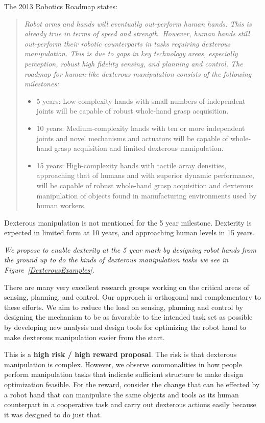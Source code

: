 The 2013 Robotics Roadmap \cite{christensen2009roadmap} states:
\begin{quotation}
{\small \it
Robot arms and hands will eventually out-perform human hands. This is already true in terms of speed and strength. However, human hands still out-perform their robotic counterparts in tasks requiring dexterous manipulation. This is due to gaps in key technology areas, especially perception, robust high fidelity sensing, and planning and control. The roadmap for human-like dexterous manipulation consists of the following milestones:
\begin{itemize}
	\item 5 years: Low-complexity hands with small numbers of independent joints will be capable of robust whole-hand grasp acquisition.
	\item 10 years: Medium-complexity hands with ten or more independent joints and novel mechanisms and actuators will be capable of whole-hand grasp acquisition and limited dexterous manipulation.
	\item 15 years: High-complexity hands with tactile array densities, approaching that of humans and with superior dynamic performance, will be capable of robust whole-hand grasp acquisition and dexterous manipulation of objects found in manufacturing environments used by human workers.
\end{itemize}}
\end{quotation}
Dexterous manipulation is not mentioned for the 5 year milestone.   Dexterity is expected in limited form at 10 years, and approaching human levels in 15 years.

{\it We propose to enable dexterity at the 5 year mark by designing robot hands from the ground up to do the kinds of dexterous manipulation tasks we see in Figure~\ref{DexterousExamples}.}

There are many very excellent research groups working on the critical areas of sensing, planning, and control.   Our approach is orthogonal and complementary to these efforts.    We aim to reduce the load on sensing, planning and control by designing the mechanism to be as favorable to the intended task set as possible by developing new analysis and design tools for optimizing the robot hand to make dexterous manipulation easier from the start.

This is a {\bf high risk / high reward proposal}.   The risk is that dexterous manipulation is  complex.   However, we observe commonalities in how people perform manipulation tasks that indicate sufficient structure to make design optimization feasible.   For the reward, consider the change that can be effected by a robot hand that can manipulate the same objects and tools as its human counterpart in a cooperative task and carry out dexterous actions easily because it was designed to do just that.

